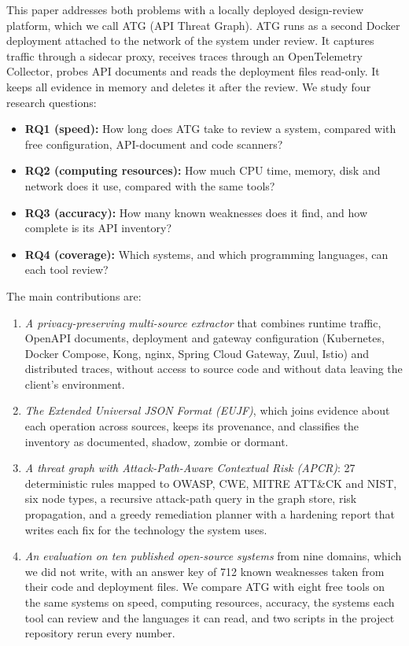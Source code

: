 \documentclass[conference]{IEEEtran}
\begin{document}
This paper addresses both problems with a locally deployed design-review platform, which we call ATG (API Threat Graph). ATG runs as a second Docker deployment attached to the network of the system under review. It captures traffic through a sidecar proxy, receives traces through an OpenTelemetry Collector, probes API documents and reads the deployment files read-only. It keeps all evidence in memory and deletes it after the review. We study four research questions:
\begin{itemize}
\item \textbf{RQ1 (speed):} How long does ATG take to review a system, compared with free configuration, API-document and code scanners?
\item \textbf{RQ2 (computing resources):} How much CPU time, memory, disk and network does it use, compared with the same tools?
\item \textbf{RQ3 (accuracy):} How many known weaknesses does it find, and how complete is its API inventory?
\item \textbf{RQ4 (coverage):} Which systems, and which programming languages, can each tool review?
\end{itemize}

The main contributions are:
\begin{enumerate}
\item \textit{A privacy-preserving multi-source extractor} that combines runtime traffic, OpenAPI documents, deployment and gateway configuration (Kubernetes, Docker Compose, Kong, nginx, Spring Cloud Gateway, Zuul, Istio) and distributed traces, without access to source code and without data leaving the client's environment.
\item \textit{The Extended Universal JSON Format (EUJF)}, which joins evidence about each operation across sources, keeps its provenance, and classifies the inventory as documented, shadow, zombie or dormant.
\item \textit{A threat graph with Attack-Path-Aware Contextual Risk (APCR)}: 27 deterministic rules mapped to OWASP, CWE, MITRE ATT\&CK and NIST, six node types, a recursive attack-path query in the graph store, risk propagation, and a greedy remediation planner with a hardening report that writes each fix for the technology the system uses.
\item \textit{An evaluation on ten published open-source systems} from nine domains, which we did not write, with an answer key of 712 known weaknesses taken from their code and deployment files. We compare ATG with eight free tools on the same systems on speed, computing resources, accuracy, the systems each tool can review and the languages it can read, and two scripts in the project repository rerun every number.
\end{enumerate}
\end{document}
